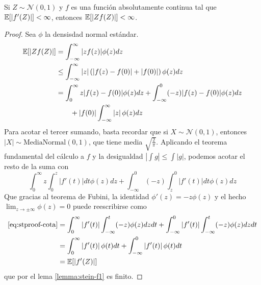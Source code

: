 \documentclass[main.tex]{subfiles}
\begin{document}
\begin{lemma}\label{lemma:stein-f2}
    Si $Z\sim \mathcal{N}(0, 1)$ y $f$ es una función absolutamente continua tal que $\operatorname{\mathbb{E}}[|f'(Z)|] < \infty$, entonces $\operatorname{\mathbb{E}}[|Zf(Z)|] < \infty$.
    \begin{proof}
        Sea $\phi$ la densisdad normal estándar.
        \begin{align*}
            \operatorname{\mathbb{E}}[|Zf(Z)|] &= \int_{-\infty}^\infty |zf(z)|\phi(z)dz \\
            &\leq \int_{-\infty}^\infty|z|\left(\left|f(z)-f(0)\right|+\left|f(0)\right|\right)\phi(z) dz \\
            &= \int_0^\infty z|f(z)-f(0)|\phi(z)dz + \int_{-\infty}^0({-z})|f(z)-f(0)|\phi(z)dz \\
                &\qquad  + |f(0)|\int_{-\infty}^\infty\left|z\right|\phi(z)dz
        \end{align*}
        Para acotar el tercer sumando, basta recordar que si $X\sim \mathcal{N}(0, 1)$, entonces $\left|X\right| \sim \text{MediaNormal}(0,1)$, que tiene media $\sqrt{\frac{2}{\pi}}$. Aplicando el teorema fundamental del cálculo a $f$ y la desigualdad $\left|\int g\right|\leq \int\left|g\right|$, podemos acotar el resto de la suma con
        \begin{equation}\label{eq:stproof-cota}
            \int_0^\infty z\int_0^z\left|f'(t)\right|dt\phi(z)dz 
                + \int_{-\infty}^0(-z)\int_z^0\left|f'(t)\right|dt\phi(z)dz
        \end{equation}
        Que gracias al teorema de Fubini, la identidad $\phi'(z) = -z\phi(z)$ y el hecho $\lim_{z\rightarrow \pm\infty}\phi(z) = 0$ puede reescribirse como
        \begin{align*}
            \eqref{eq:stproof-cota} &= \int_0^\infty \left|f'(t)\right|\int_{-\infty}^t (-z)\phi(z)dzdt
                + \int_{-\infty}^0\left|f'(t)\right|\int_{-\infty}^t(-z)\phi(z)dzdt \\
            &= \int_0^\infty \left|f'(t)\right|\phi(t)dt 
                + \int_{-\infty}^0 \left|f'(t)\right|\phi(t)dt \\
            &= \operatorname{\mathbb{E}}[|f'(Z)|]
        \end{align*}
        que por el lema \eqref{lemma:stein-f1} es finito.
    \end{proof}
\end{lemma}
\end{document}
